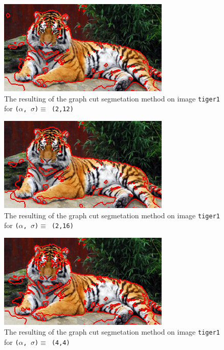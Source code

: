 {  \begin{minipage}{0.45\linewidth}
    \begin{figure}[H]
      \includegraphics[scale=0.5]{./images/04/Q11/var_a_b/tiger1/graphcut2_a2_s12.png}
      \caption{The resulting of the graph cut segmetation method on image \texttt{tiger1} for
        \texttt{($\alpha$, $\sigma$)$ \equiv$ (2,12)}}
      \label{fig:04_tiger12_a2_s12}
    \end{figure}
    \vfill
    \begin{figure}[H]
      \includegraphics[scale=0.5]{./images/04/Q11/var_a_b/tiger1/graphcut2_a2_s16.png}
      \caption{The resulting of the graph cut segmetation method on image \texttt{tiger1} for
        \texttt{($\alpha$, $\sigma$)$ \equiv$ (2,16)}}
      \label{fig:04_tiger12_a2_s16}
    \end{figure}
    \vfill
    \begin{figure}[H]
      \includegraphics[scale=0.5]{./images/04/Q11/var_a_b/tiger1/graphcut2_a4_s4.png}
      \caption{The resulting of the graph cut segmetation method on image \texttt{tiger1} for
        \texttt{($\alpha$, $\sigma$)$ \equiv$ (4,4)}}
      \label{fig:04_tiger12_a4_s4}
    \end{figure}
  \end{minipage}
}


